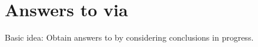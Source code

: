 \documentclass[10pt]{article}
\begin{document}

\begin{comment}
  For \issueInclusion{} to fail, need a counterexample.
  Though this is more involved.

  \begin{enumerate}
  \item
    Sense of `why' and `how'.
  \item
    Answers to \qWhy{}.
  \item
    Way to identify \fingfr{}.
  \end{enumerate}
\end{comment}

\begin{comment}
  Not really about the result.
  Argument.
  Fairly technical.
  Framework so it's possible to create a direct argument.
  Only issue is whether the definitions, ideas, etc.\ work out.
  I.e.\ whether you agree.

  Stress this point.
  Well, what do I want to stress?
  `Makes sense'.
  So, think of epistemology.
  Various cases, intuition about whether knows.
  Intuition is taken as input for creating theory.
  This is the sort of Rawlsian reflective equilibrium.

  Important constraint.
  Should not be the case framework presupposes answer.
  See how these definitions come together.
\end{comment}



\vfill


\newpage

\section{Answers to \qWhy{} via }
\label{sec:answers-qwhy}

\begin{note}
  Basic idea: Obtain answers to \qWhy{} by considering conclusions in progress.
\end{note}

\begin{comment}
  Part of why this is interesting.
  Maybe.
  No subjunctives, with the exception of thinking about events in progress.
  If you can do events in progress without subjunctives, then, things go through.
  Even projections.
  These talk about possibility, and entail various subjunctives, but that's about it.
\end{comment}
\end{document}
